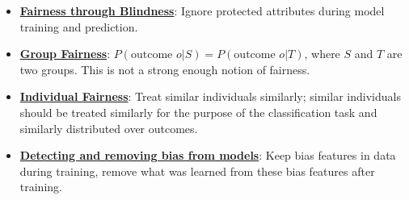 \documentclass{article}%
\begin{document}
\begin{itemize}[leftmargin=*]%
\item \href{https://purdue.brightspace.com/d2l/common/assets/pdfjs-d2l-dist/1.0.14-legacy/web/viewer.html?file=\%2Fcontent\%2Fenforced\%2F1095467-wl.202510.CS.24300.001\%2F16L2-ethics.pdf\%3Fou\%3D1095467\&lang=en-us\&container=d2l-fileviewer-rendered-pdf\&fullscreen=d2l-fileviewer-rendered-pdf-dialog\&height=667#page=25}{\textbf{Fairness through Blindness}}: Ignore protected attributes during model training and prediction.%
\item \href{https://purdue.brightspace.com/d2l/common/assets/pdfjs-d2l-dist/1.0.14-legacy/web/viewer.html?file=\%2Fcontent\%2Fenforced\%2F1095467-wl.202510.CS.24300.001\%2F16L2-ethics.pdf\%3Fou\%3D1095467\&lang=en-us\&container=d2l-fileviewer-rendered-pdf\&fullscreen=d2l-fileviewer-rendered-pdf-dialog\&height=667#page=26}{\textbf{Group Fairness}}: $P(\text{outcome } o | S) = P(\text{outcome } o | T)$, where $S$ and $T$ are two groups. This is not a strong enough notion of fairness.%
\item \href{https://purdue.brightspace.com/d2l/common/assets/pdfjs-d2l-dist/1.0.14-legacy/web/viewer.html?file=\%2Fcontent\%2Fenforced\%2F1095467-wl.202510.CS.24300.001\%2F16L2-ethics.pdf\%3Fou\%3D1095467\&lang=en-us\&container=d2l-fileviewer-rendered-pdf\&fullscreen=d2l-fileviewer-rendered-pdf-dialog\&height=667#page=27}{\textbf{Individual Fairness}}: Treat similar individuals similarly; similar individuals should be treated similarly for the purpose of the classification task and similarly distributed over outcomes.%
\item \href{https://purdue.brightspace.com/d2l/common/assets/pdfjs-d2l-dist/1.0.14-legacy/web/viewer.html?file=\%2Fcontent\%2Fenforced\%2F1095467-wl.202510.CS.24300.001\%2F16L2-ethics.pdf\%3Fou\%3D1095467\&lang=en-us\&container=d2l-fileviewer-rendered-pdf\&fullscreen=d2l-fileviewer-rendered-pdf-dialog\&height=667#page=34}{\textbf{Detecting and removing bias from models}}: Keep bias features in data during training, remove what was learned from these bias features after training.%
\end{itemize}

%
\end{document}
